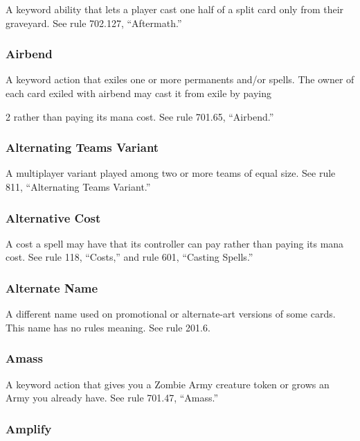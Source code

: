 A keyword ability that lets a player cast one half of a split card only from their graveyard. See rule 702.127, “Aftermath.”

\subsubsection*{Airbend}

A keyword action that exiles one or more permanents and/or spells. The owner of each card exiled with airbend may cast it from exile by paying {2 rather than paying its mana cost. See rule 701.65, “Airbend.”

\subsubsection*{Alternating Teams Variant}

A multiplayer variant played among two or more teams of equal size. See rule 811, “Alternating Teams Variant.”

\subsubsection*{Alternative Cost}

A cost a spell may have that its controller can pay rather than paying its mana cost. See rule 118, “Costs,” and rule 601, “Casting Spells.”

\subsubsection*{Alternate Name}

A different name used on promotional or alternate-art versions of some cards. This name has no rules meaning. See rule 201.6.

\subsubsection*{Amass}

A keyword action that gives you a Zombie Army creature token or grows an Army you already have. See rule 701.47, “Amass.”

\subsubsection*{Amplify}

}
